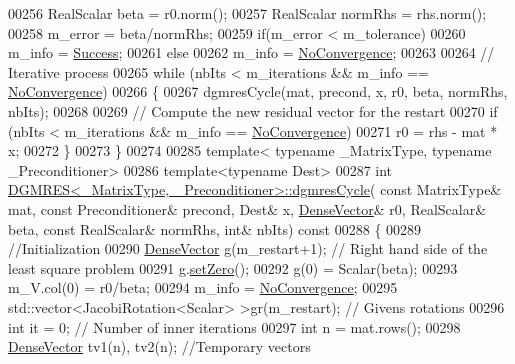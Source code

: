 \begin{DoxyCode}
00256   RealScalar beta = r0.norm(); 
00257   RealScalar normRhs = rhs.norm();
00258   m\_error = beta/normRhs; 
00259   \textcolor{keywordflow}{if}(m\_error < m\_tolerance)
00260     m\_info = \hyperlink{group__enums_gga85fad7b87587764e5cf6b513a9e0ee5ea52581b035f4b59c203b8ff999ef5fcea}{Success}; 
00261   \textcolor{keywordflow}{else}
00262     m\_info = \hyperlink{group__enums_gga85fad7b87587764e5cf6b513a9e0ee5eaba1c8763d1179778070f365ecc4157a8}{NoConvergence};
00263   
00264   \textcolor{comment}{// Iterative process}
00265   \textcolor{keywordflow}{while} (nbIts < m\_iterations && m\_info == \hyperlink{group__enums_gga85fad7b87587764e5cf6b513a9e0ee5eaba1c8763d1179778070f365ecc4157a8}{NoConvergence})
00266   \{
00267     dgmresCycle(mat, precond, x, r0, beta, normRhs, nbIts); 
00268     
00269     \textcolor{comment}{// Compute the new residual vector for the restart }
00270     \textcolor{keywordflow}{if} (nbIts < m\_iterations && m\_info == \hyperlink{group__enums_gga85fad7b87587764e5cf6b513a9e0ee5eaba1c8763d1179778070f365ecc4157a8}{NoConvergence})
00271       r0 = rhs - mat * x; 
00272   \}
00273 \} 
00274 
00285 \textcolor{keyword}{template}< \textcolor{keyword}{typename} \_MatrixType, \textcolor{keyword}{typename} \_Preconditioner>
00286 \textcolor{keyword}{template}<\textcolor{keyword}{typename} Dest>
00287 \textcolor{keywordtype}{int} \hyperlink{class_eigen_1_1_d_g_m_r_e_s_a151b188720b20e13e8e6b112a8bcc167}{DGMRES<\_MatrixType, \_Preconditioner>::dgmresCycle}(\textcolor{keyword}{
      const} MatrixType& mat, \textcolor{keyword}{const} Preconditioner& precond, Dest& x, \hyperlink{group___core___module}{DenseVector}& r0, RealScalar& beta, \textcolor{keyword}{
      const} RealScalar& normRhs, \textcolor{keywordtype}{int}& nbIts)\textcolor{keyword}{ const}
00288 \textcolor{keyword}{}\{
00289   \textcolor{comment}{//Initialization }
00290   \hyperlink{group___core___module}{DenseVector} g(m\_restart+1); \textcolor{comment}{// Right hand side of the least square problem}
00291   g.\hyperlink{class_eigen_1_1_plain_object_base_ac21ad5f989f320e46958b75ac8d9a1da}{setZero}();  
00292   g(0) = Scalar(beta); 
00293   m\_V.col(0) = r0/beta; 
00294   m\_info = \hyperlink{group__enums_gga85fad7b87587764e5cf6b513a9e0ee5eaba1c8763d1179778070f365ecc4157a8}{NoConvergence}; 
00295   std::vector<JacobiRotation<Scalar> >gr(m\_restart); \textcolor{comment}{// Givens rotations}
00296   \textcolor{keywordtype}{int} it = 0; \textcolor{comment}{// Number of inner iterations }
00297   \textcolor{keywordtype}{int} n = mat.rows();
00298   \hyperlink{group___core___module}{DenseVector} tv1(n), tv2(n);  \textcolor{comment}{//Temporary vectors}

\end{DoxyCode}
